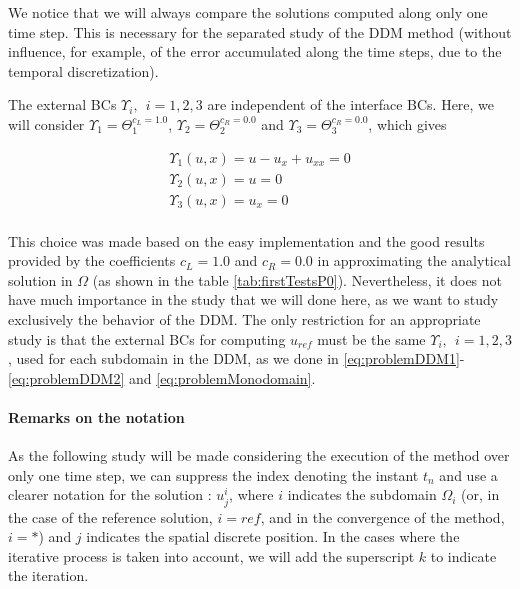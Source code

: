 \indent We notice that we will always compare the solutions computed along only one time step. This is necessary for the separated study of the DDM method (without influence, for example, of the error accumulated along the time steps, due to the temporal discretization).

\indent The external BCs $ \Upsilon_i, \ \ i=1,2,3$ are independent of the interface BCs. Here, we will consider $\Upsilon_1 = \Theta_1^{c_L = 1.0}$, $\Upsilon_2 = \Theta_2^{c_R = 0.0}$ and $\Upsilon_3 = \Theta_3^{c_R = 0.0}$, which gives

\begin{equation}
	\label{eq:externalBCsDDM}
	\begin{gathered}
	\Upsilon_1(u,x) = u - u_x + u_{xx} = 0\\
	\Upsilon_2(u,x) = u = 0\\
	\Upsilon_3(u,x) = u_x = 0\\
	\end{gathered}
\end{equation}

\indent This choice was made based on the easy implementation and the good results provided by the coefficients $c_L = 1.0$ and $c_R = 0.0$ in approximating the analytical solution in $\Omega$ (as shown in the table \ref{tab:firstTestsP0}). Nevertheless, it does not have much importance in the study that we will done here, as we want to study exclusively the behavior of the DDM. The only restriction for an appropriate study is that the external BCs for computing $u_{ref}$ must be the same $\Upsilon_i, \ \ i=1,2,3$, used for each subdomain in the DDM, as we done in \eqref{eq:problemDDM1}-\eqref{eq:problemDDM2} and \eqref{eq:problemMonodomain}.

\paragraph{Remarks on the notation}


\indent As the following study will be made considering the execution of the method over only one time step, we can suppress the index denoting the instant $t_n$ and use a clearer notation for the solution : $u_j^i$, where $i$ indicates the subdomain $\Omega_i$ (or, in the case of the reference solution, $i = ref$, and in the convergence of the method, $i = *$) and $j$ indicates the spatial discrete position. In the cases where the iterative process is taken into account, we will add the superscript $k$ to indicate the iteration.

